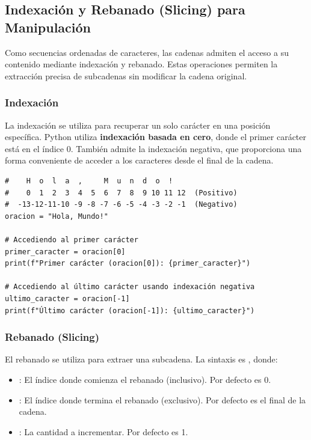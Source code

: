 \subsection{Indexación y Rebanado (Slicing) para Manipulación}
\label{subsec:string_indexing_slicing}
Como secuencias ordenadas de caracteres, las cadenas admiten el acceso a su contenido mediante indexación y rebanado. Estas operaciones permiten la extracción precisa de subcadenas sin modificar la cadena original.

\subsubsection*{Indexación}
La indexación se utiliza para recuperar un solo carácter en una posición específica. Python utiliza \textbf{indexación basada en cero}, donde el primer carácter está en el índice 0. También admite la indexación negativa, que proporciona una forma conveniente de acceder a los caracteres desde el final de la cadena.

\text{ }\begin{verbatim}
#    H  o  l  a  ,     M  u  n  d  o  !
#    0  1  2  3  4  5  6  7  8  9 10 11 12  (Positivo)
#  -13-12-11-10 -9 -8 -7 -6 -5 -4 -3 -2 -1  (Negativo)
oracion = "Hola, Mundo!"

# Accediendo al primer carácter
primer_caracter = oracion[0]
print(f"Primer carácter (oracion[0]): {primer_caracter}")

# Accediendo al último carácter usando indexación negativa
ultimo_caracter = oracion[-1]
print(f"Último carácter (oracion[-1]): {ultimo_caracter}")
\end{verbatim}

\subsubsection*{Rebanado (Slicing)}
El rebanado se utiliza para extraer una subcadena. La sintaxis es , donde:
\begin{itemize}
    \item {}: El índice donde comienza el rebanado (inclusivo). Por defecto es 0.
    \item {}: El índice donde termina el rebanado (exclusivo). Por defecto es el final de la cadena.
    \item {}: La cantidad a incrementar. Por defecto es 1.
\end{itemize}

